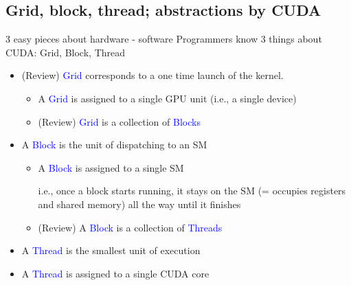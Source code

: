 \documentclass[dvipdfmx, 11pt, aspectratio=169]{beamer}   %
\begin{document}
\subsection{Grid, block, thread; abstractions by CUDA}
\begin{frame}{3 easy pieces about hardware - software}
Programmers know 3 things about CUDA: Grid, Block, Thread
  \begin{itemize}
    \item (Review) \textcolor{blue}{Grid} corresponds to a one time launch of the kernel.
    \begin{itemize}
      \item A \textcolor{blue}{Grid} is assigned to a single GPU unit (i.e., a single device)
      \item (Review) \textcolor{blue}{Grid} is a collection of \textcolor{blue}{Blocks}
    \end{itemize}
    \item A \textcolor{blue}{Block} is the unit of dispatching to an SM
    \begin{itemize}
      \item A \textcolor{blue}{Block} is assigned to a single SM 
      
      i.e., once a block starts running, it stays on the SM (= occupies registers and shared memory) all the way until it finishes
      \item (Review) A \textcolor{blue}{Block} is a collection of \textcolor{blue}{Threads}
    \end{itemize}
    \item A \textcolor{blue}{Thread} is the smallest unit of execution
    \item A \textcolor{blue}{Thread} is assigned to a single CUDA core
  \end{itemize}
\end{frame}
\end{document}
